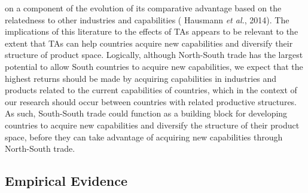 \documentclass[12pt]{article}%
\begin{document}
on a component of the evolution of its comparative advantage based on
the relatedness to other industries and capabilities (\cite{hausmann_implied_2014} Hausmann \emph{et
al.}, 2014). The implications of this literature to the effects of TAs
appears to be relevant to the extent that TAs can help countries acquire new
capabilities and diversify their structure of product space. Logically,
although North-South trade has the largest potential to allow South
countries to acquire new capabilities, we expect that the highest
returns should be made by acquiring capabilities in industries and
products related to the current capabilities of countries, which in the
context of our research should occur between countries with related
productive structures. As such, South-South trade could function as a
building block for developing countries to acquire new capabilities and
diversify the structure of their product space, before they can take
advantage of acquiring new capabilities through North-South trade.%
\subsection{Empirical Evidence}%
\label{subsec:EmpiricalEvidence}%
\end{document}
